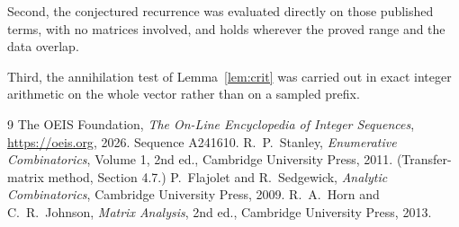 \documentclass[11pt,a4paper]{article}
\theoremstyle{plain}
\theoremstyle{definition}
\begin{document}
Second, the conjectured recurrence was evaluated directly on those published terms, with no
matrices involved, and holds wherever the proved range and the data overlap.

Third, the annihilation test of Lemma~\ref{lem:crit} was carried out in exact integer
arithmetic on the whole vector rather than on a sampled prefix.

\begin{thebibliography}{9}
 The OEIS Foundation, \emph{The On-Line Encyclopedia of Integer
Sequences}, \url{https://oeis.org}, 2026. Sequence A241610.
 R.~P.~Stanley, \emph{Enumerative Combinatorics}, Volume 1, 2nd ed.,
Cambridge University Press, 2011. (Transfer-matrix method, Section 4.7.)
 P.~Flajolet and R.~Sedgewick, \emph{Analytic Combinatorics}, Cambridge
University Press, 2009.
 R.~A.~Horn and C.~R.~Johnson, \emph{Matrix Analysis}, 2nd ed., Cambridge
University Press, 2013.
\end{thebibliography}
\end{document}
